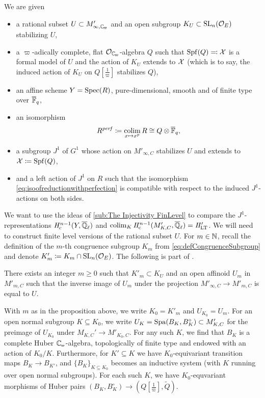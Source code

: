 \documentclass[../main.tex]{subfiles}
\begin{document}
\begin{sit}\label{sit:MiedaLTTSit}
  We are given
\begin{itemize}
  \item a rational subset $U\subset M'_{\infty, \Cp}$ and an open
    subgroup $K_U \subset \operatorname{SL}_n(\mathcal{O}_E)$ stabilizing $U$,
  \item a $\varpi$-adically complete, flat $\cO_\Cp$-algebra
    $Q$ such that $\operatorname{Spf}(Q) \eqqcolon \mathcal{X}$ is a formal model of $U$ and the action of 
    $K_U$ extends to $\mathcal{X}$ (which is to say, the induced action of $K_U$ on $Q[\tfrac 1\varpi]$ stabilizes $Q$),
  \item an affine scheme $Y=\operatorname{Spec}(R)$, pure-dimensional, smooth and 
    of finite type over ${\overline {\mathbb{F}}_q}$,
  \item an isomorphism
    \begin{equation}\label{eq:isoofreductionwithperfection}
      R^{\mathit{perf}} \coloneq \operatorname*{colim}_{x \mapsto x^p} R \cong Q \otimes {\overline{\mathbb{F}}_q},
    \end{equation}
  \item a subgroup $J^1$ of $G^1$ whose action on $M'_{\infty, C}$ stabilizes
    $U$ and extends to $\mathcal{X} \coloneq \operatorname{Spf}(Q)$, 
  \item and a left action of $J^1$ on $R$ such that the isomorphism
    \eqref{eq:isoofreductionwithperfection} is compatible with respect to the
    induced $J^1$-actions on both sides.
\end{itemize}
\end{sit}

We want to use the ideas of \cref{sub:The Injectivity FinLevel} to compare the
$J^1$-representations
$\mathit H_{\mathrm{c}}^{n-1}(Y, {\overline {\mathbb{Q}}_\ell})$ and $\operatorname*{colim}_K \mathit H_{\mathrm{c}}^{n-1}(M'_{K,C}, {\overline {\mathbb{Q}}_\ell}) = \mathit H'_{\mathrm{LT}}$. 
We will need to construct finite level versions of the rational subset $U$. 
For $m \in \mathbb{N}$, recall the definition of the $m$-th congruence subgroup $K_m$ from 
\eqref{eq:defCongruenceSubgroup} and denote $K'_m \coloneq K_m \cap \operatorname{SL}_n(\mathcal{O}_E)$. 
The following is part of \cite[Proposition 4.5]{mieda2016geometric}.

\begin{prop}\label{prop:FiniteLevelU}
  There exists an integer $m \geq 0$ such that $K'_m \subset K_U$ and an open affinoid
  $U_m$ in $M'_{m, C}$ such that the inverse image of $U_m$ under the projection
  $M'_{\infty, C} \to M'_{m, C}$ is equal to $U$. 
\end{prop}
With $m$ as in the proposition above, we write $K_0 = K'_m$ and $U_{K_0} = 
U_m$. For an open normal subgroup $K \subseteq K_0$, we write $U_K = \operatorname{Spa}(B_K,
B^\circ_K) \subset M'_{K, C}$ for the preimage of $U_{K_0}$ under 
$M_{K,C}' \to M'_{K_0, C}$. For any such $K$, we find
that $B_K$ is a complete Huber $\Cp$-algebra, 
topologically of finite type and endowed with an action of $K_0/K$. Furthermore,
for $K' \subseteq K$ we have $K_0$-equivariant transition maps $B_{K} \to B_{K'}$,
and $\{B_K\}_{K \subseteq K_0}$ becomes an inductive system (with $K$ running over 
open normal subgroups). For each such $K$, we have $K_0$-equvariant morphisms
of Huber pairs $(B_K, B_K^\circ) \to (Q[\tfrac 1\varpi], \tilde Q)$.
\end{document}
